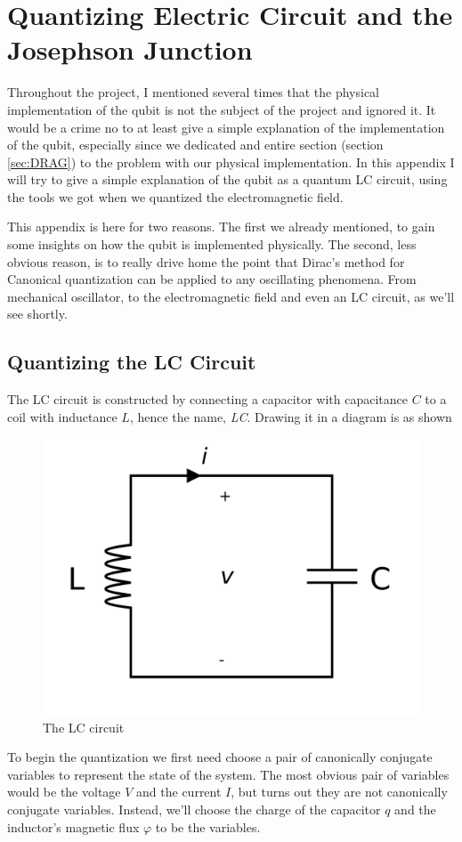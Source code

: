 \chapter{Quantizing Electric Circuit and the Josephson Junction} \label{appen:LC}
Throughout the project, I mentioned several times that the physical implementation of the qubit is not  the subject of the project and ignored it. It would be a crime no to at least give a simple explanation of the implementation of the qubit, especially since we dedicated and entire section  (section \ref{sec:DRAG}) to the problem with our physical implementation. In this appendix I will try to give a simple explanation of  the qubit as a quantum LC circuit, using the  tools we got when we quantized the electromagnetic field.

This appendix is here for two reasons. The first we already mentioned, to gain some insights on how the qubit is implemented physically. The second, less obvious reason, is to really drive home the point that Dirac's method for Canonical quantization can be applied to any oscillating phenomena. From mechanical oscillator, to the electromagnetic field and even an LC circuit, as we'll see shortly.

\section{Quantizing the LC Circuit}
The LC circuit is constructed by connecting a capacitor with capacitance $C$ to a coil with inductance $L$, hence the name, \textit{LC}. Drawing it in a diagram is as shown
\begin{figure}[H]
    \centering
    \includegraphics[width=0.4\columnwidth]{gfx/LC-circuit.png}
    \caption{The LC circuit} 
    \label{fig:LC-circuit}
\end{figure}

To begin the quantization we first need choose a pair of canonically conjugate variables to represent the state of the system. The most obvious pair of variables would be the voltage $V$ and the current $I$, but turns out they are not canonically conjugate variables. Instead, we'll choose the charge of the capacitor $q$ and the inductor's magnetic flux $\varphi$ to be the variables. 


